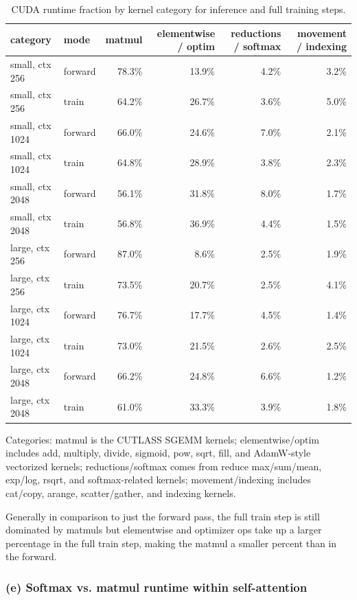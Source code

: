 \documentclass[11pt]{article}
\begin{document}
\begin{table}[H]
\centering
\scriptsize
\caption{CUDA runtime fraction by kernel category for inference and full training steps.}
\setlength{\tabcolsep}{3pt}
\begin{tabular}{llrrrr}
\toprule
category & mode & matmul & elementwise / optim & reductions / softmax & movement / indexing \\
\midrule
small, ctx 256 & forward & 78.3\% & 13.9\% & 4.2\% & 3.2\% \\
small, ctx 256 & train & 64.2\% & 26.7\% & 3.6\% & 5.0\% \\
small, ctx 1024 & forward & 66.0\% & 24.6\% & 7.0\% & 2.1\% \\
small, ctx 1024 & train & 64.8\% & 28.9\% & 3.8\% & 2.3\% \\
small, ctx 2048 & forward & 56.1\% & 31.8\% & 8.0\% & 1.7\% \\
small, ctx 2048 & train & 56.8\% & 36.9\% & 4.4\% & 1.5\% \\
large, ctx 256 & forward & 87.0\% & 8.6\% & 2.5\% & 1.9\% \\
large, ctx 256 & train & 73.5\% & 20.7\% & 2.5\% & 4.1\% \\
large, ctx 1024 & forward & 76.7\% & 17.7\% & 4.5\% & 1.4\% \\
large, ctx 1024 & train & 73.0\% & 21.5\% & 2.6\% & 2.5\% \\
large, ctx 2048 & forward & 66.2\% & 24.8\% & 6.6\% & 1.2\% \\
large, ctx 2048 & train & 61.0\% & 33.3\% & 3.9\% & 1.8\% \\
\bottomrule
\end{tabular}
\end{table}

Categories: matmul is the CUTLASS SGEMM kernels; elementwise/optim includes add, multiply, divide, sigmoid, pow, sqrt, fill, and AdamW-style vectorized kernels; reductions/softmax comes from reduce max/sum/mean, exp/log, rsqrt, and softmax-related kernels; movement/indexing includes cat/copy, arange, scatter/gather, and indexing kernels.

Generally in comparison to just the forward pass, the full train step is still dominated by matmuls but elementwise and optimizer ops take up a larger percentage in the full train step, making the matmul a smaller percent than in the forward.

\subsubsection*{(e) Softmax vs. matmul runtime within self-attention}
\end{document}
